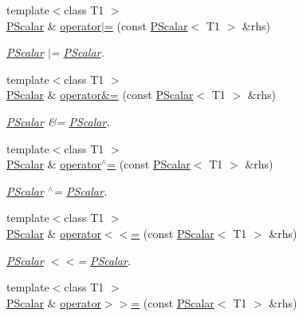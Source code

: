 \begin{DoxyCompactItemize}
{\footnotesize template$<$class T1 $>$ }\\\mbox{\hyperlink{classENSEM_1_1PScalar}{P\+Scalar}} \& \mbox{\hyperlink{classENSEM_1_1PScalar_a59ee3adbb8dabcfb25aae9f9390dcef0}{operator$\vert$=}} (const \mbox{\hyperlink{classENSEM_1_1PScalar}{P\+Scalar}}$<$ T1 $>$ \&rhs)
\begin{DoxyCompactList}\small\item\em \mbox{\hyperlink{classENSEM_1_1PScalar}{P\+Scalar}} $\vert$= \mbox{\hyperlink{classENSEM_1_1PScalar}{P\+Scalar}}. \end{DoxyCompactList}\item 
{\footnotesize template$<$class T1 $>$ }\\\mbox{\hyperlink{classENSEM_1_1PScalar}{P\+Scalar}} \& \mbox{\hyperlink{classENSEM_1_1PScalar_a9c683c36c7129b6b016af09f8d5cda42}{operator\&=}} (const \mbox{\hyperlink{classENSEM_1_1PScalar}{P\+Scalar}}$<$ T1 $>$ \&rhs)
\begin{DoxyCompactList}\small\item\em \mbox{\hyperlink{classENSEM_1_1PScalar}{P\+Scalar}} \&= \mbox{\hyperlink{classENSEM_1_1PScalar}{P\+Scalar}}. \end{DoxyCompactList}\item 
{\footnotesize template$<$class T1 $>$ }\\\mbox{\hyperlink{classENSEM_1_1PScalar}{P\+Scalar}} \& \mbox{\hyperlink{classENSEM_1_1PScalar_a3f256371cc925f01209559addfcbb632}{operator$^\wedge$=}} (const \mbox{\hyperlink{classENSEM_1_1PScalar}{P\+Scalar}}$<$ T1 $>$ \&rhs)
\begin{DoxyCompactList}\small\item\em \mbox{\hyperlink{classENSEM_1_1PScalar}{P\+Scalar}} $^\wedge$= \mbox{\hyperlink{classENSEM_1_1PScalar}{P\+Scalar}}. \end{DoxyCompactList}\item 
{\footnotesize template$<$class T1 $>$ }\\\mbox{\hyperlink{classENSEM_1_1PScalar}{P\+Scalar}} \& \mbox{\hyperlink{classENSEM_1_1PScalar_ade643675ab6ef041676e1098ac740b29}{operator$<$$<$=}} (const \mbox{\hyperlink{classENSEM_1_1PScalar}{P\+Scalar}}$<$ T1 $>$ \&rhs)
\begin{DoxyCompactList}\small\item\em \mbox{\hyperlink{classENSEM_1_1PScalar}{P\+Scalar}} $<$$<$= \mbox{\hyperlink{classENSEM_1_1PScalar}{P\+Scalar}}. \end{DoxyCompactList}\item 
{\footnotesize template$<$class T1 $>$ }\\\mbox{\hyperlink{classENSEM_1_1PScalar}{P\+Scalar}} \& \mbox{\hyperlink{classENSEM_1_1PScalar_a8fe07cd0462ddff9e3d0858ebe29e77c}{operator$>$$>$=}} (const \mbox{\hyperlink{classENSEM_1_1PScalar}{P\+Scalar}}$<$ T1 $>$ \&rhs)

\end{DoxyCompactItemize}
